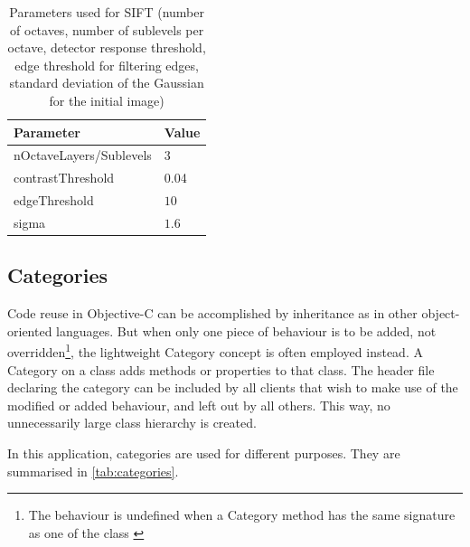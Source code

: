 \begin{table}
   \begin{center}
      \begin{tabular}{>{\ttfamily}ll}
         \rowcolor{white}
         \toprule
         \rmfamily Parameter     & Value \\
         \midrule
         nOctaveLayers/Sublevels & $3$ \\
         contrastThreshold       & 0.04 \\
         edgeThreshold           & $10$ \\
         sigma                   & $1.6$ \\
         \bottomrule
      \end{tabular}
      \caption[Parameters used for SIFT]{Parameters used for SIFT (number of octaves, number of sublevels
      per octave, detector response threshold, edge threshold for filtering
   edges, standard deviation of the Gaussian for the initial image)}
      \label{tab:sift_params}
   \end{center}
\end{table}

\subsection{Categories}

Code reuse in Objective-C can be accomplished by inheritance as in other
object-oriented languages. But when only one piece of behaviour is to be
added, not overridden\footnote{The behaviour is undefined when a Category method
has the same signature as one of the class \citep{customizing}}, the
lightweight Category concept is often employed instead. A Category on a class adds methods
or properties to that class. The header file declaring the category can be
included by all clients that wish to make use of the modified or added
behaviour, and left out by all others. This way, no unnecessarily large class
hierarchy is created.

In this application, categories are used for different purposes. They are
summarised in \autoref{tab:categories}.

